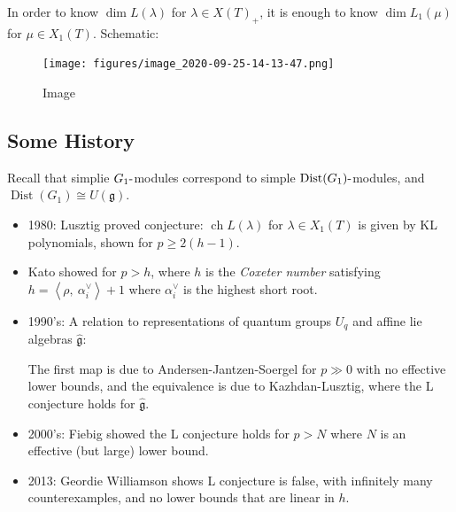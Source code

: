 \begin{corollary}[?]

In order to know \(\dim L(\lambda)\) for \(\lambda \in X(T)_+\), it is
enough to know \(\dim L_1(\mu)\) for \(\mu \in X_1(T)\). Schematic:

\begin{figure}
\centering
\texttt{[image: figures/image\_2020-09-25-14-13-47.png]}
\caption{Image}
\end{figure}

\end{corollary}

\hypertarget{some-history}{%
\subsection{Some History}\label{some-history}}

Recall that simplie \(G_1{\hbox{-}}\)modules correspond to simple
\(\operatorname{Dist}(G_1){\hbox{-}}\)modules, and
\(\operatorname{Dist}(G_1) \cong U({\mathfrak{g}})\).

\begin{itemize}
\item
  1980: Lusztig proved conjecture: \(\operatorname{ch}L(\lambda)\) for
  \(\lambda \in X_1(T)\) is given by KL polynomials, shown for
  \(p \geq 2(h-1)\).
\item
  Kato showed for \(p> h\), where \(h\) is the \emph{Coxeter number}
  satisfying
  \(h = {\left\langle {\rho},~{\alpha_i ^\vee} \right\rangle} + 1\)
  where \(\alpha_i^\vee\) is the highest short root.
\item
  1990's: A relation to representations of quantum groups \(U_q\) and
  affine lie algebras \(\widehat{{\mathfrak{g}}}\):

  \begin{center}
  \end{center}

  The first map is due to Andersen-Jantzen-Soergel for \(p\gg 0\) with
  no effective lower bounds, and the equivalence is due to
  Kazhdan-Lusztig, where the L conjecture holds for
  \(\widehat{{\mathfrak{g}}}\).
\item
  2000's: Fiebig showed the L conjecture holds for \(p>N\) where \(N\)
  is an effective (but large) lower bound.
\item
  2013: Geordie Williamson shows L conjecture is false, with infinitely
  many counterexamples, and no lower bounds that are linear in \(h\).
\end{itemize}

